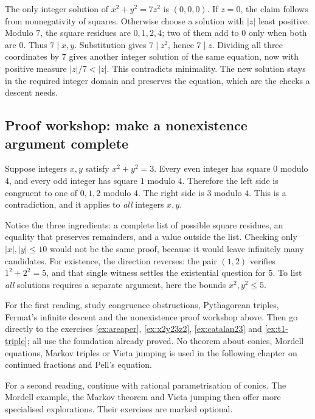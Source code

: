 \begin{examplex}
The only integer solution of $x^2+y^2=7z^2$ is $(0,0,0)$.
If $z=0$, the claim follows from nonnegativity of squares.
Otherwise choose a solution with $|z|$ least positive.
Modulo $7$, the square residues are $0,1,2,4$; two of them add to $0$
only when both are $0$. Thus $7\mid x,y$.
Substitution gives $7\mid z^2$, hence $7\mid z$.
Dividing all three coordinates by $7$ gives another integer solution
of the same equation, now with positive measure $|z|/7<|z|$.
This contradicts minimality. The new solution stays in the required
integer domain and preserves the equation, which are the checks a descent needs.
\end{examplex}

\subsection*{Proof workshop: make a nonexistence argument complete}

Suppose integers $x,y$ satisfy $x^2+y^2=3$.
Every even integer has square $0$ modulo $4$,
and every odd integer has square $1$ modulo $4$.
Therefore the left side is congruent to one of
$0,1,2$ modulo $4$. The right side is $3$ modulo
$4$. This is a contradiction, and it applies to
\emph{all} integers $x,y$.

Notice the three ingredients: a complete list of
possible square residues, an equality that preserves
remainders, and a value outside the list. Checking
only $|x|,|y|\le10$ would not be the same proof,
because it would leave infinitely many candidates.
For existence, the direction reverses: the pair
$(1,2)$ verifies $1^2+2^2=5$, and that single
witness settles the existential question for $5$.
To list \emph{all} solutions requires a separate
argument, here the bounds $x^2,y^2\le5$.

\begin{reminder}
For the first reading, study congruence obstructions, Pythagorean triples,
Fermat's infinite descent and the nonexistence proof workshop above.
Then go directly to the exercises
\ref{ex:areaper}, \ref{ex:x2y23z2}, \ref{ex:catalan23}
and \ref{ex:t1-triple}; all use the foundation already proved.
No theorem about conics, Mordell equations, Markov triples or Vieta
jumping is used in the following chapter on continued fractions and Pell's
equation.

For a second reading, continue with rational parametrisation of conics.
The Mordell example, the Markov theorem and Vieta jumping then offer
more specialised explorations. Their exercises are marked optional.
\end{reminder}

